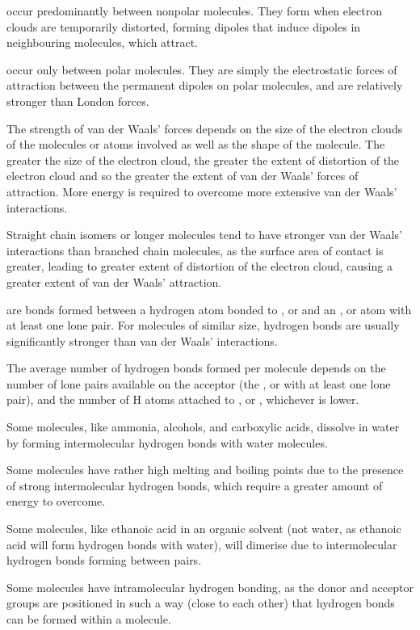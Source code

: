 \documentclass[Chemistry.tex]{subfiles}
\begin{document}
 occur predominantly between nonpolar molecules. They form when electron clouds are temporarily distorted, forming dipoles that induce dipoles in neighbouring molecules, which attract.

 occur only between polar molecules. They are simply the electrostatic forces of attraction between the permanent dipoles on polar molecules, and are relatively stronger than London forces.

The strength of van der Waals' forces depends on the size of the electron clouds of the molecules or atoms involved as well as the shape of the molecule. The greater the size of the electron cloud, the greater the extent of distortion of the electron cloud and so the greater the extent of van der Waals' forces of attraction. More energy is required to overcome more extensive van der Waals' interactions.

Straight chain isomers or longer molecules tend to have stronger van der Waals' interactions than branched chain molecules, as the surface area of contact is greater, leading to greater extent of distortion of the electron cloud, causing a greater extent of van der Waals' attraction.

 are bonds formed between a hydrogen atom bonded to ,  or  and an ,  or  atom with at least one lone pair. For molecules of similar size, hydrogen bonds are usually significantly stronger than van der Waals' interactions.

The average number of hydrogen bonds formed per molecule depends on the number of lone pairs available on the acceptor (the ,  or  with at least one lone pair), and the number of H atoms attached to ,  or , whichever is lower.

Some molecules, like ammonia, alcohols, and carboxylic acids, dissolve in water by forming intermolecular hydrogen bonds with water molecules.

Some molecules have rather high melting and boiling points due to the presence of strong intermolecular hydrogen bonds, which require a greater amount of energy to overcome.

Some molecules, like ethanoic acid in an organic solvent (not water, as ethanoic acid will form hydrogen bonds with water), will dimerise due to intermolecular hydrogen bonds forming between pairs.

Some molecules have intramolecular hydrogen bonding, as the donor and acceptor groups are positioned in such a way (close to each other) that hydrogen bonds can be formed within a molecule.
\end{document}
